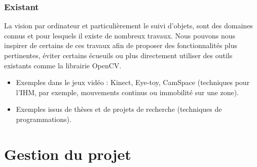 \documentclass{report}
\begin{document}
		\subsubsection{Existant}
		La vision par ordinateur et particulièrement le suivi d'objets, sont des domaines connus et pour lesquels il existe de nombreux travaux. Nous pouvons nous inspirer de certains de ces travaux afin de proposer des fonctionnalités plus pertinentes, éviter certains écueuils ou plus directement utiliser des outils existants comme la librairie OpenCV.\\
			\begin{itemize}
				\item Exemples dans le jeux vidéo : Kinect, Eye-toy, CamSpace (techniques pour l'IHM, par exemple, mouvements continus ou immobilité sur une zone).
				\item Exemples issus de thèses et de projets de recherche (techniques de programmations).
			\end{itemize}
		\section{Gestion du projet}
\end{document}
